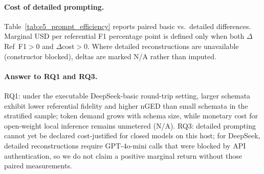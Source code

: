 \paragraph{Cost of detailed prompting.}
Table~\ref{tab:e5_prompt_efficiency} reports paired basic vs.\ detailed differences. Marginal USD per referential F1 percentage point is defined only when both $\Delta$Ref~F1$>0$ and $\Delta$cost$>0$. Where detailed reconstructions are unavailable (constructor blocked), deltas are marked N/A rather than imputed.

\paragraph{Answer to RQ1 and RQ3.}
RQ1: under the executable DeepSeek-basic round-trip setting, larger schemata exhibit lower referential fidelity and higher nGED than small schemata in the stratified sample; token demand grows with schema size, while monetary cost for open-weight local inference remains unmetered (N/A). RQ3: detailed prompting cannot yet be declared cost-justified for closed models on this host; for DeepSeek, detailed reconstructions require GPT-4o-mini calls that were blocked by API authentication, so we do not claim a positive marginal return without those paired measurements.


